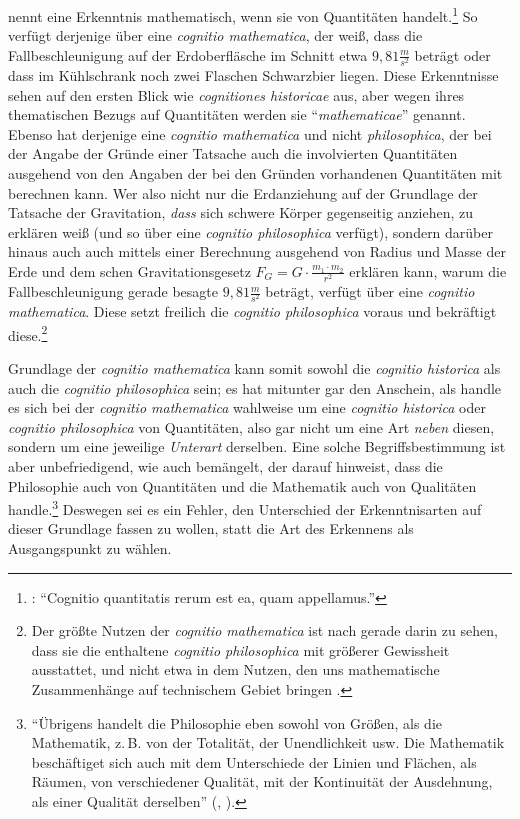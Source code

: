  nennt eine Erkenntnis
mathematisch, wenn sie von Quantitäten handelt.\footnote{\cite[Vgl.][\S~14]{Wolff:Discursuspraeliminarisdephilosophiaingenere1996}:
\enquote{Cognitio quantitatis rerum est ea, quam 
appellamus.}} So verfügt derjenige über eine \emph{cognitio mathematica}, der
weiß, dass die Fallbeschleunigung auf der Erdoberfläsche im Schnitt etwa $9,81
\frac{m}{s^2}$ beträgt oder dass im Kühlschrank noch zwei Flaschen Schwarzbier
liegen. Diese Erkenntnisse sehen auf den ersten Blick wie \emph{cognitiones
historicae} aus, aber wegen ihres thematischen Bezugs auf Quantitäten werden sie
\enquote{\emph{mathematicae}} genannt. Ebenso hat derjenige eine \emph{cognitio
mathematica} und nicht \emph{philosophica}, der bei der Angabe der Gründe einer
Tatsache auch die involvierten Quantitäten ausgehend von den Angaben der bei den
Gründen vorhandenen Quantitäten mit berechnen kann. Wer also
nicht nur die Erdanziehung auf der Grundlage der Tatsache der Gravitation,
\emph{dass} sich schwere Körper gegenseitig anziehen, zu erklären weiß (und so
über eine \emph{cognitio philosophica} verfügt), sondern darüber hinaus auch
auch mittels einer Berechnung ausgehend von Radius und Masse der Erde und dem
schen Gravitationsgesetz $ F_G = G \cdot \frac{m_1 \cdot
m_2}{r^2} $ erklären kann, warum die Fallbeschleunigung gerade besagte $9,81
\frac{m}{s^2}$ beträgt, verfügt über eine \emph{cognitio mathematica}. Diese
setzt freilich die \emph{cognitio philosophica} voraus und bekräftigt
diese.\footnote{Der größte Nutzen der \emph{cognitio mathematica} ist nach
 gerade darin zu sehen, dass sie die
enthaltene \emph{cognitio philosophica} mit größerer Gewissheit ausstattet, und
nicht etwa in dem Nutzen, den uns mathematische Zusammenhänge auf technischem
Gebiet bringen \parencite[vgl.][\S~27]{Wolff:Discursuspraeliminarisdephilosophiaingenere1996}.}


Grundlage der \emph{cognitio mathematica} kann somit sowohl die \emph{cognitio
historica} als auch die \emph{cognitio philosophica} sein; es hat mitunter gar
den Anschein, als handle es sich bei der \emph{cognitio mathematica} wahlweise
um eine \emph{cognitio historica} oder \emph{cognitio philosophica} von
Quantitäten, also gar nicht um eine Art \emph{neben} diesen, sondern um eine
jeweilige \emph{Unterart} derselben. Eine solche Begriffsbestimmung ist aber
unbefriedigend, wie auch  bemängelt, der darauf hinweist,
dass die Philosophie auch von Quantitäten und die Mathematik auch von Qualitäten
handle.\footnote{\enquote{Übrigens handelt die
Philosophie eben sowohl von Größen, als die Mathematik, z.\,B. von der Totalität, der Unendlichkeit usw.
Die Mathematik beschäftiget sich auch mit dem Unterschiede der Linien und
Flächen, als Räumen, von verschiedener Qualität, mit der Kontinuität der
Ausdehnung, als einer Qualität derselben} \mkbibparens{\cite[][B
743]{Kant:KritikderreinenVernunft2003}, \cite[][III:
470.15--20]{Kant:GesammelteWerke1900ff.}}.} Deswegen sei es ein Fehler, den
Unterschied der Erkenntnisarten auf dieser Grundlage fassen zu wollen, statt die
Art des Erkennens als Ausgangspunkt zu wählen.




